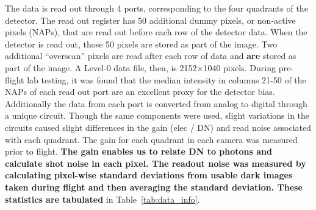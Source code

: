 \documentclass[linenumbers,trackchanges]{aastex63}
\begin{document}
The data is read out through 4 ports, corresponding to the four quadrants of the detector.  The read out register has 50 additional dummy pixels, or non-active pixels (NAPs), that are read out before each row of the detector data.  When the detector is read out, those 50 pixels are stored as part of the image.  Two additional ``overscan'' pixels are read after each row of data and \textbf{are} stored as part of the image.  A Level-0 data file, then, is 2152$\times$1040 pixels.   During pre-flight lab testing, it was found that the median intensity in columns 21-50 of the NAPs of each read out port are an excellent proxy for the detector bias.  Additionally the data from each port is converted from analog to digital through a unique circuit.  Though the same components were used, slight variations in the circuits caused slight differences in the gain (elec / DN) and read  noise associated with each quadrant.  The gain for each quadrant in each camera was measured prior to flight.  \textbf{The gain enables us to relate DN to photons and calculate shot noise in each pixel. The readout noise was measured by calculating pixel-wise standard deviations from usable dark images taken during flight and then averaging the standard deviation. These statistics are tabulated} in Table~\ref{tab:data_info}.
    
\end{document}
